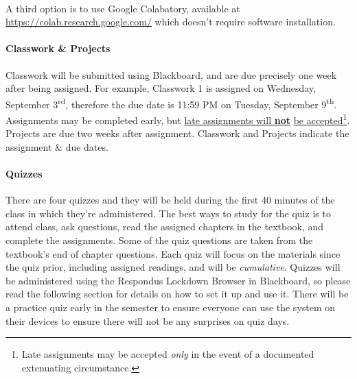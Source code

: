 \documentclass[letter,10pt]{article}
\begin{document}
\paragraph{}A third option is to use Google Colabatory, available at \url{https://colab.research.google.com/} which doesn't require software installation.

\label{sec:cwhw}
\paragraph{Classwork \& Projects}Classwork will be submitted using Blackboard, and are due precisely one week after being assigned. For example, Classwork 1 is assigned on Wednesday, September 3\textsuperscript{rd}, therefore the due date is 11:59 PM on Tuesday, September 9\textsuperscript{th}. Assignments may be completed early, but \underline{\hypertarget{sec:cwhw}{late assignments} will \textbf{not}} \underline{be accepted}\footnote{Late assignments may be accepted \textit{only} in the event of a documented extenuating circumstance.}. Projects are due two weeks after assignment. Classwork and Projects indicate the assignment \& due dates.

\paragraph{Quizzes}There are four quizzes and they will be held during the first 40 minutes of the class in which they're administered. The best ways to study for the quiz is to attend class, ask questions, read the assigned chapters in the textbook, and complete the assignments. Some of the quiz questions are taken from the textbook's end of chapter questions. Each quiz will focus on the materials since the quiz prior, including assigned readings, and will be \textit{cumulative}. Quizzes will be administered using the Respondus Lockdown Browser in Blackboard, so please read the following section for details on how to set it up and use it. There will be a practice quiz early in the semester to ensure everyone can use the system on their devices to ensure there will not be any surprises on quiz days.
\end{document}
